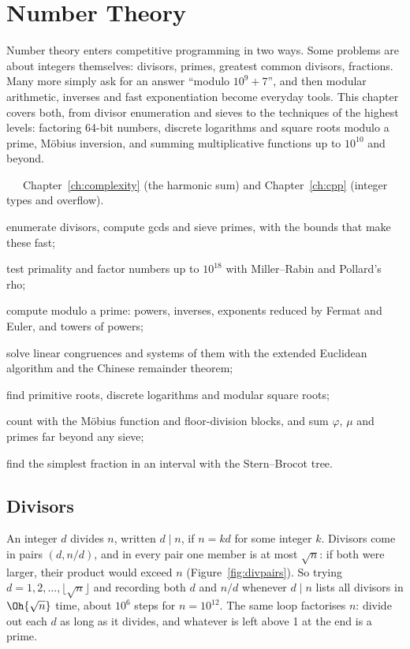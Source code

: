 \chapter{Number Theory}\label{ch:numbertheory}

Number theory enters competitive programming in two ways. Some problems are about integers themselves: divisors, primes, greatest
common divisors, fractions. Many more simply ask for an answer ``modulo $10^9 + 7$'', and then modular arithmetic, inverses and fast
exponentiation become everyday tools. This chapter covers both, from divisor enumeration and sieves to the techniques of the highest
levels: factoring 64-bit numbers, discrete logarithms and square roots modulo a prime, M\"obius inversion, and summing multiplicative
functions up to $10^{10}$ and beyond.

\begin{chapterintro}{\silver\ \gold\ \plat\ \ioi}{Chapter~\ref{ch:complexity} (the harmonic sum) and Chapter~\ref{ch:cpp} (integer
types and overflow).}
  \item enumerate divisors, compute gcds and sieve primes, with the bounds that make these fast;
  \item test primality and factor numbers up to $10^{18}$ with Miller--Rabin and Pollard's rho;
  \item compute modulo a prime: powers, inverses, exponents reduced by Fermat and Euler, and towers of powers;
  \item solve linear congruences and systems of them with the extended Euclidean algorithm and the Chinese remainder theorem;
  \item find primitive roots, discrete logarithms and modular square roots;
  \item count with the M\"obius function and floor-division blocks, and sum $\varphi$, $\mu$ and primes far beyond any sieve;
  \item find the simplest fraction in an interval with the Stern--Brocot tree.
\end{chapterintro}

\section[Divisors]{Divisors \hfill \silver}\label{sec:divisors}

An integer $d$ divides $n$, written $d \mid n$, if $n = kd$ for some integer $k$. Divisors come in pairs $(d, n/d)$, and in every
pair one member is at most $\sqrt n$: if both were larger, their product would exceed $n$ (Figure~\ref{fig:divpairs}). So trying
$d = 1, 2, \dots, \lfloor \sqrt n \rfloor$ and recording both $d$ and $n/d$ whenever $d \mid n$ lists all divisors in $\Oh{\sqrt n}$
time, about $10^6$ steps for $n = 10^{12}$. The same loop factorises $n$: divide out each $d$ as long as it divides, and whatever is
left above 1 at the end is a prime.


